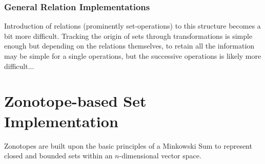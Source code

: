 \documentclass[11pt]{article}
\begin{document}
\subsubsection{General Relation Implementations}
Introduction of relations (prominently set-operations) to this structure becomes a bit more difficult.
Tracking the origin of sets through transformations is simple enough but depending on the relations themselves, to retain all the information may be simple for a single operations, but the successive operations is likely more difficult...









\section{Zonotope-based Set Implementation}

Zonotopes are built upon the basic principles of a Minkowski Sum to represent closed and bounded sets within an $n$-dimensional vector space.
\end{document}
